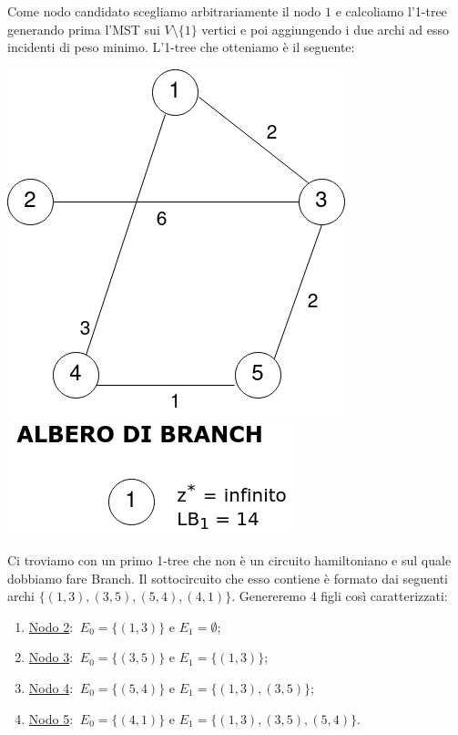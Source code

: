 \documentclass[
	article,			%
	12pt,				%
	oneside,			%
	a4paper,			%
	english,			%
	italian,				%
	sumario=tradicional,
	]{abntex2}
\begin{document}
Come nodo candidato scegliamo arbitrariamente il nodo $1$ e calcoliamo l'1-tree generando prima l'MST sui $V\setminus\{1\}$ vertici e poi aggiungendo i due archi ad esso incidenti di peso minimo. L'1-tree che otteniamo è il seguente:
\begin{center}
    \includegraphics[scale=0.33]{files/primo1Tree.png}
    \qquad \qquad \qquad
    \includegraphics[scale=0.4]{files/alberoBranch1.png}
\end{center}
Ci troviamo con un primo 1-tree che non è un circuito hamiltoniano e sul quale dobbiamo fare Branch. Il sottocircuito che esso contiene è formato dai seguenti archi $\{(1,3),(3,5),(5,4),(4,1)\}$. Genereremo 4 figli così caratterizzati:
\begin{enumerate}
    \item [] \underline{Nodo 2}: $\:E_0 = \{(1,3)\}$ e $E_1 = \emptyset$;
    \item [] \underline{Nodo 3}: $\:E_0 = \{(3,5)\}$ e $E_1 = \{(1,3)\}$;
    \item [] \underline{Nodo 4}: $\:E_0 = \{(5,4)\}$ e $E_1 = \{(1,3),(3,5)\}$;
    \item [] \underline{Nodo 5}: $\:E_0 = \{(4,1)\}$ e $E_1 = \{(1,3),(3,5),(5,4)\}$.
\end{enumerate}
\end{document}
